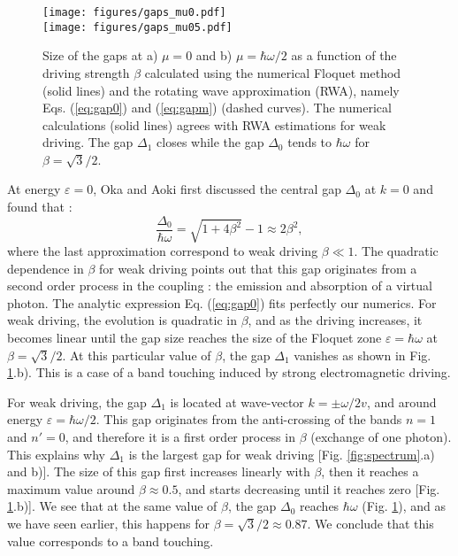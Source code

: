 \documentclass[aps,prb,showpacs,superscriptaddress,twocolumn,10pt,floatfix]{revtex4-1}
\newcommand{\ep}{\varepsilon}
\begin{document}
\begin{figure}[h!]
\texttt{[image: figures/gaps\_mu0.pdf]} \\
\texttt{[image: figures/gaps\_mu05.pdf]}
\caption{Size of the gaps at a) $\mu=0$ and b) $\mu=\hbar\omega/2$ as a function of the driving strength $\beta$ calculated using the numerical Floquet method (solid lines) and the rotating wave approximation (RWA), namely Eqs. (\ref{eq:gap0}) and (\ref{eq:gapm}) (dashed curves). The numerical calculations (solid lines) agrees with RWA estimations for weak driving. The gap $\Delta_1$ closes while the gap $\Delta_0$ tends to $\hbar\omega$ for $\beta=\sqrt{3}/2$.}
\label{fig:gaps0}
\end{figure}

At energy $\ep=0$, Oka and Aoki\cite{Oka2009} first discussed the central gap $\Delta_0$ at $k=0$ and found that :
\begin{equation}
\frac{\Delta_0}{\hbar\omega}=\sqrt{1+4\beta^2}-1\approx2\beta^2 ,
\label{eq:gap0}
\end{equation}
where the last approximation correspond to weak driving $\beta\ll1$. The quadratic dependence in $\beta$ for weak driving points out that this gap originates from a second order process in the coupling : the emission and absorption of a virtual photon. The analytic expression Eq. (\ref{eq:gap0}) fits perfectly our numerics. For weak driving, the evolution is quadratic in $\beta$, and as the driving increases, it becomes linear until the gap size reaches the size of the Floquet zone $\ep=\hbar\omega$ at $\beta=\sqrt{3}/2$. At this particular value of $\beta$, the gap $\Delta_1$ vanishes as shown in Fig. \ref{fig:gaps0}.b). This is a case of a band touching induced by strong electromagnetic driving.
 
For weak driving, the gap $\Delta_1$ is located at wave-vector $k=\pm\omega/2v$, and around energy $\ep=\hbar\omega/2$. This gap originates from the anti-crossing of the bands $n=1$ and $n'=0$, and therefore it is a first order process in $\beta$ (exchange of one photon). This explains why $\Delta_1$ is the largest gap for weak driving [Fig. \ref{fig:spectrum}.a) and b)]. The size of this gap first increases linearly with $\beta$, then it reaches a maximum value around $\beta\approx0.5$, and starts decreasing until it reaches zero [Fig. \ref{fig:gaps0}.b)]. We see that at the same value of $\beta$, the gap $\Delta_0$ reaches $\hbar\omega$ (Fig. \ref{fig:gaps0}), and as we have seen earlier, this happens for $\beta=\sqrt{3}/2\approx 0.87$. We conclude that this value corresponds to a band touching.
\end{document}
